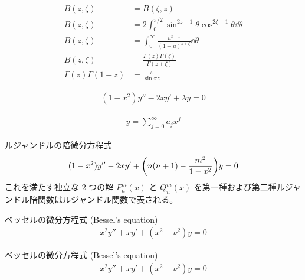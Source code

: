 \documentclass[uplatex,dvipdfmx,a4paper,11pt]{jlreq}
\theoremstyle{definition}
\begin{document}
\begin{proposition}
  \begin{align}
    B(z, \zeta)            & = B(\zeta, z)                                                          \\
    B(z, \zeta)            & = 2\int_0^{\pi/2}\sin^{2z - 1}\theta\cos^{2\zeta - 1}\theta\dd{\theta} \\
    B(z, \zeta)            & = \int_0^{\infty}\frac{u^{z-1}}{(1 + u)^{z + \zeta}}\dd{\theta}        \\
    B(z, \zeta)            & = \frac{\Gamma(z)\Gamma(\zeta)}{\Gamma(z + \zeta)}                     \\
    \Gamma(z)\Gamma(1 - z) & = \frac{\pi}{\sin\pi z}
  \end{align}
\end{proposition}

\begin{definition}[ルジャンドル微分方程式]
  \begin{align}
    (1 - x^2)y'' - 2xy' + \lambda y = 0
  \end{align}
\end{definition}

\begin{align}
  y = \sum_{j=0}^{\infty}a_jx^j
\end{align}

\begin{definition}[ルジャンドルの陪微分方程式]
  ルジャンドルの陪微分方程式
  \begin{align}
    (1 - x^2)y'' - 2xy' + \qty(n(n + 1) - \frac{m^2}{1 - x^2})y = 0
  \end{align}
  これを満たす独立な 2 つの解 $P_n^m(x)$ と $Q_n^m(x)$ を第一種および第二種ルジャンドル陪関数はルジャンドル関数で表される。
\end{definition}

\begin{definition}
  ベッセルの微分方程式 (Bessel's equation)
  \begin{align}
    x^2y'' + xy' + (x^2 - \nu^2)y = 0
  \end{align}
\end{definition}
\begin{definition}
  ベッセルの微分方程式 (Bessel's equation)
  \begin{align}
    x^2y'' + xy' + (x^2 - \nu^2)y = 0
  \end{align}
\end{definition}
\end{document}
